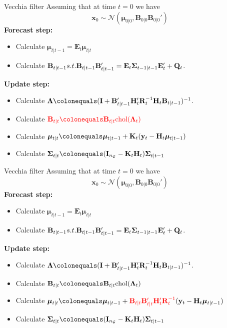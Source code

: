 \documentclass{beamer}
\newcommand{\bx}{\mathbf{x}}
\newcommand{\by}{\mathbf{y}}
\newcommand{\bE}{\mathbf{E}}
\newcommand{\bI}{\mathbf{I}}
\newcommand{\bH}{\mathbf{H}}
\newcommand{\bK}{\mathbf{K}}
\newcommand{\bQ}{\mathbf{Q}}
\newcommand{\bB}{\mathbf{B}}
\newcommand{\bR}{\mathbf{R}}
\newcommand{\bfmu}{\bm{\mu}}
\newcommand{\bfSigma}{\bm{\Sigma}}
\newcommand{\bfLambda}{\bm{\Lambda}}
\newcommand{\normal}{\mathcal{N}}
\newcommand{\grid}{\mathcal{G}}
\begin{document}
\begin{frame}{Vecchia filter}
Assuming that at time $t=0$ we have 
$$\bx_0 \sim \normal(\bfmu_{0|0}, \bB_{0|0}\bB_{0|0}')$$
\textbf{Forecast step:}
\begin{itemize}
    \item Calculate $\bfmu_{t|t-1} = \bE_t \bfmu_{t|t}$
    \item Calculate $\bB_{t|t-1} s.t. \newline \bB_{t|t-1} \bB'_{t|t-1} = \bE_t \bfSigma_{t-1|t-1} \bE_t' + \bQ_t$.
\end{itemize}
\textbf{Update step:}
\begin{itemize}
    \item Calculate $\bfLambda \colonequals (\bI + \bB_{t|t-1}'\bH_t'\bR_t^{-1}\bH_t\bB_{t|t-1})^{-1}$.
    \item Calculate $\color{red}\bB_{t|t} \colonequals \bB_{t|t}\text{chol}(\bfLambda_t)\color{black}$
    \item Calculate $\bfmu_{t|t} \colonequals \bfmu_{t|t-1} + \bK_t(\by_t - \bH_t \bfmu_{t|t-1})$
    \item Calculate $\bfSigma_{t|t} \colonequals (\bI_{n_\grid} - \bK_t \bH_t) \bfSigma_{t|t-1}$
\end{itemize}
\end{frame}



\begin{frame}{Vecchia filter}
Assuming that at time $t=0$ we have 
$$\bx_0 \sim \normal(\bfmu_{0|0}, \bB_{0|0}\bB_{0|0}')$$
\textbf{Forecast step:}
\begin{itemize}
    \item Calculate $\bfmu_{t|t-1} = \bE_t \bfmu_{t|t}$
    \item Calculate $\bB_{t|t-1} s.t. \newline \bB_{t|t-1} \bB'_{t|t-1} = \bE_t \bfSigma_{t-1|t-1} \bE_t' + \bQ_t$.
\end{itemize}
\textbf{Update step:}
\begin{itemize}
    \item Calculate $\bfLambda \colonequals (\bI + \bB_{t|t-1}'\bH_t'\bR_t^{-1}\bH_t\bB_{t|t-1})^{-1}$.
    \item Calculate $\bB_{t|t} \colonequals \bB_{t|t}\text{chol}(\bfLambda_t)$
    \item Calculate $\bfmu_{t|t} \colonequals \bfmu_{t|t-1} +\color{red}\bB_{t|t}\bB_{t|t}'\bH_t'\bR_t^{-1}\color{black}(\by_t - \bH_t \bfmu_{t|t-1})$
    \item Calculate $\bfSigma_{t|t} \colonequals (\bI_{n_\grid} - \bK_t \bH_t) \bfSigma_{t|t-1}$
\end{itemize}
\end{frame}
\end{document}
